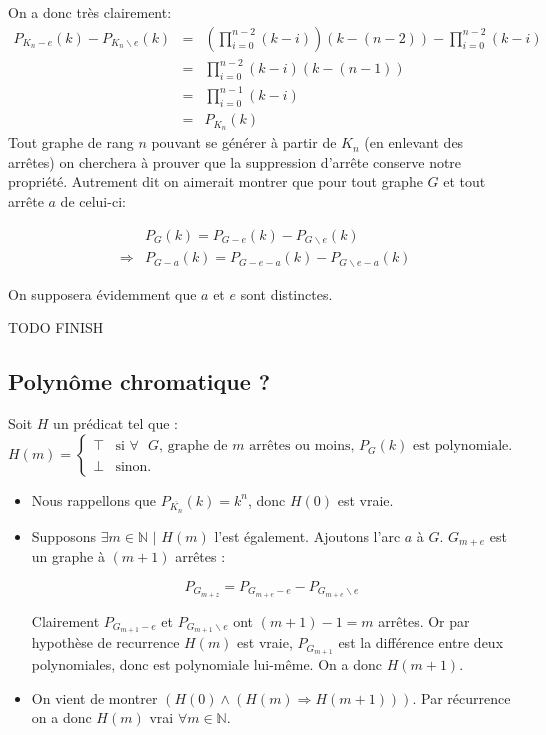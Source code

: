 On a donc très clairement:
\begin{eqnarray*}
P_{K_n-e}(k) -  P_{K_n\backslash e}(k) &=& (\prod_{i=0}^{n-2}(k-i))(k-(n-2)) - \prod_{i=0}^{n-2}(k-i)\\
&=& \prod_{i=0}^{n-2}(k-i)(k-(n-1))\\
&=& \prod_{i=0}^{n-1}(k-i)\\
&=& P_{K_n}(k)
\end{eqnarray*}
Tout graphe de rang $n$ pouvant se générer à partir de $K_n$ (en enlevant des arrêtes) on cherchera à prouver que la suppression d'arrête conserve notre propriété. Autrement dit on aimerait montrer que pour tout graphe $G$ et tout arrête $a$ de celui-ci:

\begin{eqnarray*}
&&P_G(k) = P_{G-e}(k) - P_{G \backslash e}(k) \\
&\Rightarrow&  P_{G-a}(k) = P_{G-e-a}(k) - P_{G \backslash e-a}(k)
\end{eqnarray*}

On supposera évidemment que $a$ et $e$ sont distinctes. 

TODO FINISH

\subsection{Polynôme chromatique ?}
Soit $H$ un prédicat tel que :
\begin{displaymath}
	H(m) = \left\{ \begin{array}{ll}
	\top & \textrm{si $\forall$ $G$, graphe de $m$ arrêtes ou moins, $P_G(k)$ est polynomiale.} \\
	\bot & \textrm{sinon.}
	\end{array} \right.
\end{displaymath} 
\begin{itemize} 
\item Nous rappellons que $P_{\overline{K_n}}(k)=k^n$, donc $H(0)$ est vraie. 
\item Supposons $\exists m \in \mathbb{N}$ $|$ $H(m)$ l'est également. Ajoutons l'arc $a$ à $G$. $G_{m+e}$ est un graphe à $(m+1)$ arrêtes :

\[ P_{G_{m+z}} = P_{G_{m+e}-e} - P_{G_{m+e} \backslash e} \]

Clairement $P_{G_{m+1}-e}$ et $P_{G_{m+1} \backslash e}$ ont $(m+1)-1 = m$ arrêtes. Or par hypothèse de recurrence $H(m)$ est vraie,
$P_{G_{m+1}}$ est la différence entre deux polynomiales, donc est polynomiale lui-même. On a donc $H(m+1)$.
\item On vient de montrer $(H(0) \wedge (H(m) \Rightarrow H(m+1)))$. Par récurrence on a donc $H(m)$ vrai $\forall m \in \mathbb{N}$. 

\end{itemize} 

